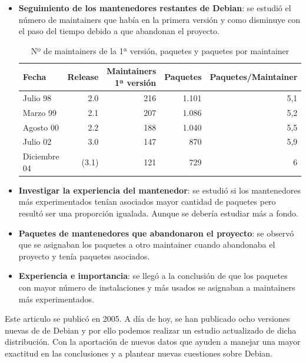 \documentclass[a4paper, 12pt]{book}
\begin{document}
\begin{itemize}
	\item \textbf {Seguimiento de los mantenedores restantes de Debian}: se estudió el número de maintainers que había en la primera versión y como disminuye con el paso del tiempo debido a que abandonan el proyecto. 
	
	\begin{table}[h]
		\begin{tabular}{|l|r|r|r|r|}
			\hline
			Fecha        & Release & Maintainers 1ª versión & Paquetes & Paquetes/Maintainer \\ \hline
			Julio 98     & 2.0     & 216                     & 1.101       & 5,1                 \\ \hline
			Marzo 99    & 2.1     & 207                     & 1.086       & 5,2                 \\ \hline
			Agosto 00   & 2.2     & 188                    & 1.040       & 5,5                 \\ \hline
			Julio 02     & 3.0     & 147                    & 870       & 5,9                 \\ \hline
			Diciembre 04 & (3.1)   & 121                    & 729      & 6                   \\ \hline
		\end{tabular}
		\caption{Nº de maintainers de la 1ª versión, paquetes y paquetes por maintainer}
	\end{table}
	
	\item \textbf {Investigar la experiencia del mantenedor}: se estudió si los mantenedores más experimentados tenían asociados mayor cantidad de paquetes pero resultó ser una proporción igualada. Aunque se debería estudiar más a fondo.
	
	\item \textbf {Paquetes de mantenedores que abandonaron el proyecto}: se observó que se asignaban los paquetes a otro maintainer cuando abandonaba el proyecto y tenía paquetes asociados. 
	
	\item \textbf {Experiencia e importancia}: se llegó a la conclusión de que los paquetes con mayor número de instalaciones y más usados se asignaban a maintainers más experimentados.
	
	
\end{itemize}

Este articulo se publicó en 2005. A día de hoy, se han publicado ocho versiones nuevas de de Debian y por ello podemos realizar un estudio actualizado de dicha distribución. Con la aportación de nuevos datos que ayuden a manejar una mayor exactitud en las conclusiones y a plantear nuevas cuestiones sobre Debian.
\end{document}
